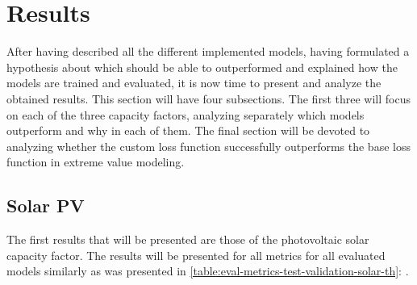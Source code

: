\section{Results}
After having described all the different implemented models, having formulated a hypothesis about which should be able to outperformed and explained how the models are trained and evaluated, it is now time to present and analyze the obtained results. This section will have four subsections. The first three will focus on each of the three capacity factors, analyzing separately which models outperform and why in each of them. The final section will be devoted to analyzing whether the custom loss function successfully outperforms the base loss function in extreme value modeling. 
\subsection{Solar PV}
\label{s:solar-pv-results}
The first results that will be presented are those of the photovoltaic solar capacity factor. The results will be presented for all metrics for all evaluated models similarly as was presented in \autoref{table:eval-metrics-test-validation-solar-th}: .

